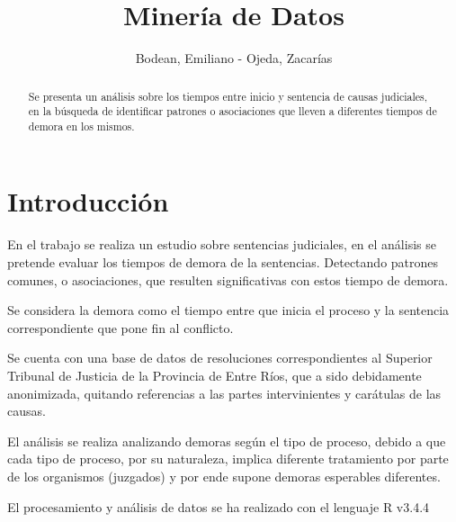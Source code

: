 \documentclass[runningheads,a4paper]{llncs}
\begin{document}
\title{Minería de Datos}


\author{Bodean, Emiliano - Ojeda, Zacarías}




%
\iffalse
\authorinfo{
  
}{
}{
  \{\}
}
\fi


\maketitle


	\begin{abstract}
		Se presenta un análisis sobre los tiempos entre inicio y sentencia de
causas judiciales, en la búsqueda de identificar patrones o asociaciones
que lleven a diferentes tiempos de demora en los mismos.
	\end{abstract}


\section{Introducción}\label{introduccion}

En el trabajo se realiza un estudio sobre sentencias judiciales, en el
análisis se pretende evaluar los tiempos de demora de la sentencias.
Detectando patrones comunes, o asociaciones, que resulten significativas
con estos tiempo de demora.

Se considera la demora como el tiempo entre que inicia el proceso y la
sentencia correspondiente que pone fin al conflicto.

Se cuenta con una base de datos de resoluciones correspondientes al
Superior Tribunal de Justicia de la Provincia de Entre Ríos, que a sido
debidamente anonimizada, quitando referencias a las partes
intervinientes y carátulas de las causas.

El análisis se realiza analizando demoras según el tipo de proceso,
debido a que cada tipo de proceso, por su naturaleza, implica diferente
tratamiento por parte de los organismos (juzgados) y por ende supone
demoras esperables diferentes.

El procesamiento y análisis de datos se ha realizado con el lenguaje R
v3.4.4 \autocite{xiang2007robust}
\end{document}

